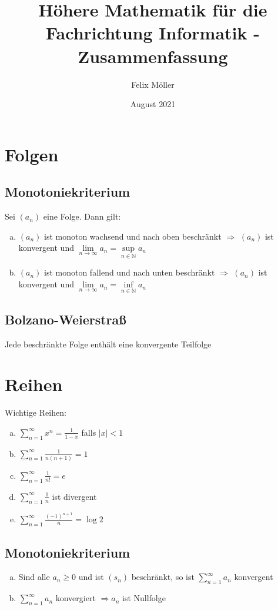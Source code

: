 \documentclass{article}
\title{Höhere Mathematik für die Fachrichtung Informatik - Zusammenfassung}
\author{Felix Möller}
\date{August 2021}
\begin{document}
\maketitle

\section{Folgen}

\subsection{Monotoniekriterium}
Sei $(a_n)$ eine Folge. Dann gilt:
\begin{enumerate}[a)]
    \item $(a_n)$ ist monoton wachsend und nach oben beschränkt $\Rightarrow$ $(a_n)$ ist konvergent und
    $\lim \limits_{n \to \infty} a_n = \sup \limits_{n \in \mathbb{N}} a_n$
    \item $(a_n)$ ist monoton fallend und nach unten beschränkt $\Rightarrow$ $(a_n)$ ist konvergent und
    $\lim \limits_{n \to \infty} a_n = \inf \limits_{n \in \mathbb{N}} a_n$
\end{enumerate}

\subsection{Bolzano-Weierstraß}
Jede beschränkte Folge enthält eine konvergente Teilfolge

\section{Reihen}
Wichtige Reihen:
\begin{enumerate}[a)]
    \item $\sum \limits_{n=1}^{\infty} x^n = \frac{1}{1-x}$ falls $|x| < 1$
    \item $\sum \limits_{n=1}^{\infty} \frac{1}{n(n+1)} = 1$
    \item $\sum \limits_{n=1}^{\infty} \frac{1}{n!} = e$
    \item $\sum \limits_{n=1}^{\infty} \frac{1}{n}$ ist divergent
    \item $\sum \limits_{n=1}^{\infty} \frac{(-1)^{n+1}}{n} = \log 2$
\end{enumerate}

\subsection{Monotoniekriterium}
\begin{enumerate} [a)]
    \item Sind alle $a_n \geq 0$ und ist $(s_n)$ beschränkt, so ist $\sum \limits_{n=1}^{\infty} a_n$ konvergent
    \item $\sum \limits_{n=1}^{\infty} a_n$ konvergiert $\Rightarrow a_n$ ist Nullfolge
\end{enumerate}
\end{document}
